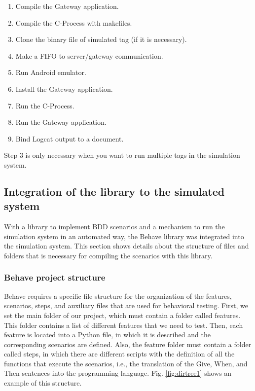 \documentclass[journal]{IEEEtran}	%
\begin{document}
\begin{enumerate}
    \item Compile the Gateway application.
    \item Compile the C-Process with makefiles.
    \item Clone the binary file of simulated tag (if it is necessary).
    \item Make a FIFO to server/gateway communication.
    \item Run Android emulator.
    \item Install the Gateway application.
    \item Run the C-Process.
    \item Run the Gateway application.
    \item Bind Logcat output to a document.
\end{enumerate}

Step 3 is only necessary when you want to run multiple tags in the simulation system.


\subsection{Integration of the library to the simulated system}


With a library to implement BDD scenarios and a mechanism to run the simulation system in an automated way, the Behave library was integrated into the simulation system. This section shows details about the structure of files and folders that is  necessary for compiling the scenarios with this library.


\subsubsection{Behave project structure}

Behave requires a specific file structure for the organization of the features, scenarios, steps, and auxiliary files that are used for behavioral testing. First, we set the main folder of our project, which must contain a folder called features. This folder contains a list of different features that we need to test. Then, each feature is located into a Python file, in which it is described and the corresponding scenarios are defined. Also, the feature folder must contain a folder called steps, in which there are different scripts with the definition of all the functions that execute the scenarios, i.e., the translation of the Give, When, and Then sentences into the programming language. Fig. \ref{fig:dirtree1} shows an example of this structure.
\end{document}
